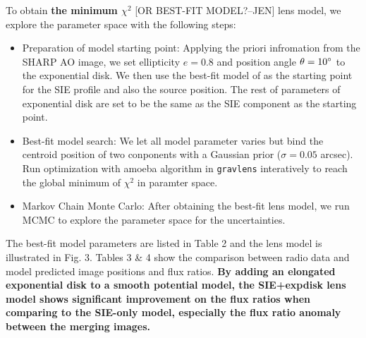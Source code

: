 \documentclass[useAMS,usenatbib]{mnras}
\begin{document}
To obtain \textbf{the minimum $\chi^2$} [OR BEST-FIT MODEL?--JEN] lens model, we explore the parameter space with the following steps: 
\begin{itemize}
\item Preparation of model starting point: Applying the priori infromation from the SHARP AO image, we set ellipticity $e=0.8$ and position angle $\theta=10 \hbox{$^\circ$}$ to the exponential disk. We then use the best-fit model of \citet{Marlow99} as the starting point for the SIE profile and also the source position. The rest of parameters of exponential disk are set to be the same as the SIE component as the starting point.
\item Best-fit model search: We let all model parameter varies but bind the centroid position of two conponents with a Gaussian prior ($\sigma = 0.05 $ arcsec). Run optimization with amoeba algorithm in {\tt gravlens} interatively to reach the global minimum of $\chi^2$ in paramter space.
\item Markov Chain Monte Carlo: After obtaining the best-fit lens model, we run MCMC to explore the parameter space for the uncertainties.
\end{itemize}

The best-fit model parameters are listed in Table 2 and the lens model is illustrated in Fig. 3. 
Tables 3 \& 4 show the comparison between radio data and model predicted image positions and flux ratios.  
\textbf{By adding an elongated exponential disk to a smooth potential model, the SIE+expdisk lens model shows significant improvement on the flux ratios when comparing to the SIE-only model, especially the flux ratio anomaly between the merging images.}
\end{document}
